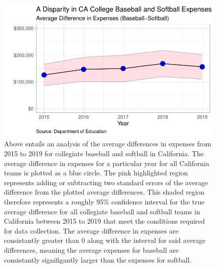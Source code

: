 \documentclass[
  letterpaper,
  DIV=11,
  numbers=noendperiod]{scrartcl}
\begin{document}
\begin{figure}[H]

{\centering \includegraphics{Report_files/figure-pdf/unnamed-chunk-3-1.pdf}

}

\caption{Above entails an analysis of the average differences in
expenses from 2015 to 2019 for collegiate baseball and softball in
California. The average difference in expenses for a particular year for
all California teams is plotted as a blue circle. The pink highlighted
region represents adding or subtracting two standard errors of the
average difference from the plotted average differences. This shaded
region therefore represents a roughly 95\% confidence interval for the
true average difference for all collegiate baseball and softball teams
in California between 2015 to 2019 that meet the conditions required for
data collection. The average difference in expenses are consistantly
greater than 0 along with the interval for said average differences,
meaning the average expenses for baseball are consistantly signifigantly
larger than the expenses for softball.}

\end{figure}
\end{document}
